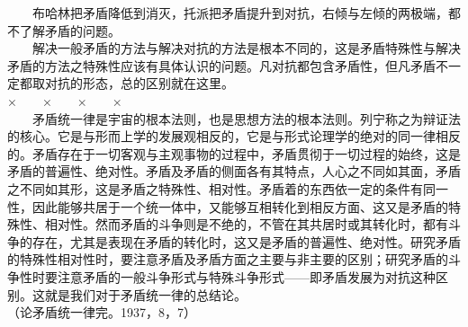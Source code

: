 \documentclass[cn,11pt,chinese]{elegantbook}
\begin{document}
　　布哈林把矛盾降低到消灭，托派把矛盾提升到对抗，右倾与左倾的两极端，都不了解矛盾的问题。\\
　　解决一般矛盾的方法与解决对抗的方法是根本不同的，这是矛盾特殊性与解决矛盾的方法之特殊性应该有具体认识的问题。凡对抗都包含矛盾性，但凡矛盾不一定都取对抗的形态，总的区别就在这里。 \\
×　　×　　×　　×\\
　　矛盾统一律是宇宙的根本法则，也是思想方法的根本法则。列宁称之为辩证法的核心。它是与形而上学的发展观相反的，它是与形式论理学的绝对的同一律相反的。矛盾存在于一切客观与主观事物的过程中，矛盾贯彻于一切过程的始终，这是矛盾的普遍性、绝对性。矛盾及矛盾的侧面各有其特点，人心之不同如其面，矛盾之不同如其形，这是矛盾之特殊性、相对性。矛盾着的东西依一定的条件有同一性，因此能够共居于一个统一体中，又能够互相转化到相反方面、这又是矛盾的特殊性、相对性。然而矛盾的斗争则是不绝的，不管在其共居时或其转化时，都有斗争的存在，尤其是表现在矛盾的转化时，这又是矛盾的普遍性、绝对性。研究矛盾的特殊性相对性时，要注意矛盾及矛盾方面之主要与非主要的区别；研究矛盾的斗争性时要注意矛盾的一般斗争形式与特殊斗争形式——即矛盾发展为对抗这种区别。这就是我们对于矛盾统一律的总结论。\\
（论矛盾统一律完。1937，8，7）\\
\newpage
\end{document}
